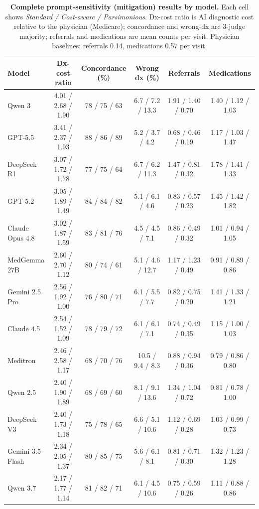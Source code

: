 \begin{table}[ht]
\centering
\footnotesize
\caption{\textbf{Complete prompt-sensitivity (mitigation) results by model.} Each cell shows \emph{Standard / Cost-aware / Parsimonious}. Dx-cost ratio is AI diagnostic cost relative to the physician (Medicare); concordance and wrong-dx are 3-judge majority; referrals and medications are mean counts per visit. Physician baselines: referrals 0.14, medications 0.57 per visit.}
\label{tab:mitigation_full}
\begin{tabular}{lccccc}
\toprule
Model & Dx-cost ratio & Concordance (\%) & Wrong dx (\%) & Referrals & Medications \\
\midrule
Qwen 3 & 4.01 / 2.68 / 1.90 & 78 / 75 / 63 & 6.7 / 7.2 / 13.3 & 1.91 / 1.40 / 0.70 & 1.40 / 1.12 / 1.03 \\
GPT-5.5 & 3.41 / 2.37 / 1.93 & 88 / 86 / 89 & 5.2 / 3.7 / 4.2 & 0.68 / 0.46 / 0.19 & 1.17 / 1.03 / 1.47 \\
DeepSeek R1 & 3.07 / 1.72 / 1.78 & 77 / 75 / 64 & 6.7 / 6.2 / 11.3 & 1.47 / 0.81 / 0.32 & 1.78 / 1.41 / 1.33 \\
GPT-5.2 & 3.05 / 1.89 / 1.49 & 84 / 84 / 82 & 5.1 / 6.1 / 4.6 & 0.83 / 0.57 / 0.23 & 1.45 / 1.42 / 1.82 \\
Claude Opus 4.8 & 3.02 / 1.87 / 1.59 & 83 / 81 / 76 & 4.5 / 4.5 / 7.1 & 0.86 / 0.49 / 0.32 & 1.01 / 0.94 / 1.05 \\
MedGemma 27B & 2.60 / 2.70 / 1.12 & 80 / 74 / 61 & 5.1 / 4.6 / 12.7 & 1.17 / 1.23 / 0.49 & 0.91 / 0.89 / 0.86 \\
Gemini 2.5 Pro & 2.56 / 1.92 / 1.00 & 76 / 80 / 71 & 6.1 / 5.5 / 7.7 & 0.82 / 0.75 / 0.20 & 1.41 / 1.33 / 1.21 \\
Claude 4.5 & 2.54 / 1.52 / 1.09 & 78 / 79 / 72 & 6.1 / 6.1 / 7.1 & 0.74 / 0.49 / 0.35 & 1.15 / 1.00 / 1.03 \\
Meditron & 2.46 / 2.58 / 1.17 & 68 / 70 / 76 & 10.5 / 9.4 / 8.3 & 0.88 / 0.94 / 0.36 & 0.79 / 0.86 / 0.80 \\
Qwen 2.5 & 2.40 / 1.90 / 1.89 & 68 / 69 / 60 & 8.1 / 9.1 / 13.6 & 1.34 / 1.04 / 0.72 & 0.81 / 0.78 / 1.00 \\
DeepSeek V3 & 2.40 / 1.73 / 1.18 & 75 / 78 / 65 & 6.6 / 5.1 / 10.6 & 1.12 / 0.69 / 0.28 & 1.03 / 0.99 / 0.73 \\
Gemini 3.5 Flash & 2.34 / 2.05 / 1.37 & 80 / 85 / 75 & 5.6 / 6.1 / 8.1 & 0.81 / 0.71 / 0.30 & 1.32 / 1.23 / 1.28 \\
Qwen 3.7 & 2.17 / 1.77 / 1.14 & 81 / 82 / 71 & 6.1 / 4.5 / 10.6 & 0.75 / 0.59 / 0.26 & 1.11 / 0.88 / 0.86 \\

\end{tabular}
\end{table}
